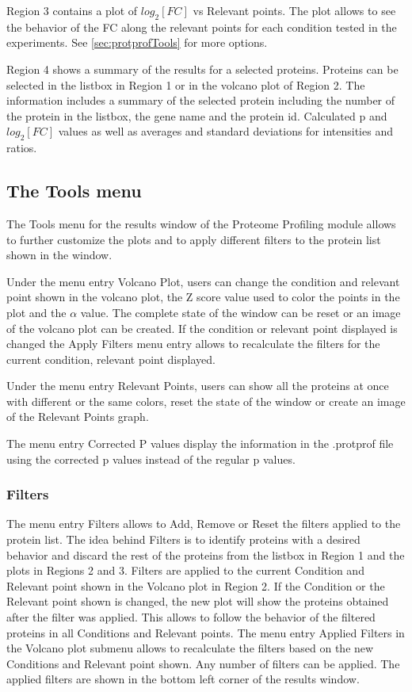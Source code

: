 Region \num{3} contains a plot of $log_2[FC]$ vs Relevant points. The plot allows to see the behavior of the FC along the relevant points for each condition tested in the experiments. See \autoref{sec:protprofTools} for more options.

Region \num{4} shows a summary of the results for a selected proteins. Proteins can be selected in the listbox in Region \num{1} or in the volcano plot of Region \num{2}. The information includes a summary of the selected protein including the number of the protein in the listbox, the gene name and the protein id. Calculated p and $log_2[FC]$ values as well as averages and standard deviations for intensities and ratios.

\subsection{The Tools menu}
\label{sec:protprofTools}

The Tools menu for the results window of the Proteome Profiling module allows to further customize the plots and to apply different filters to the protein list shown in the window.

Under the menu entry Volcano Plot, users can change the condition and relevant point shown in the volcano plot, the Z score value used to color the points in the plot and the $\alpha$ value. The complete state of the window can be reset or an image of the volcano plot can be created. If the condition or relevant point displayed is changed the Apply Filters menu entry allows to recalculate the filters for the current condition, relevant point displayed.

Under the menu entry Relevant Points, users can show all the proteins at once with different or the same colors, reset the state of the window or create an image of the Relevant Points graph.

The menu entry Corrected P values display the information in the .protprof file using the corrected p values instead of the regular p values.

\subsubsection{Filters}

The menu entry Filters allows to Add, Remove or Reset the filters applied to the protein list. The idea behind Filters is to identify proteins with a desired behavior and discard the rest of the proteins from the listbox in Region \num{1} and the plots in Regions \num{2} and \num{3}. Filters are applied to the current Condition and Relevant point shown in the Volcano plot in Region \num{2}. If the Condition or the Relevant point shown is changed, the new plot will show the proteins obtained after the filter was applied. This allows to follow the behavior of the filtered proteins in all Conditions and Relevant points. The menu entry Applied Filters in the Volcano plot submenu allows to recalculate the filters based on the new Conditions and Relevant point shown. Any number of filters can be applied. The applied filters are shown in the bottom left corner of the results window. 

